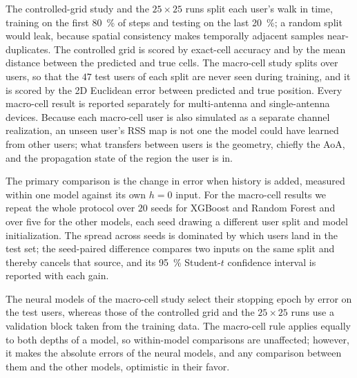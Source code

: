 The controlled-grid study and the $25\times25$ runs split each user's walk in time, training on the first \SI{80}{\percent} of steps and testing on the last \SI{20}{\percent}; a random split would leak, because spatial consistency makes temporally adjacent samples near-duplicates. The controlled grid is scored by exact-cell accuracy and by the mean distance between the predicted and true cells. The macro-cell study splits over users, so that the $47$ test users of each split are never seen during training, and it is scored by the 2D Euclidean error between predicted and true position. Every macro-cell result is reported separately for multi-antenna and single-antenna devices. Because each macro-cell user is also simulated as a separate channel realization, an unseen user's RSS map is not one the model could have learned from other users; what transfers between users is the geometry, chiefly the AoA, and the propagation state of the region the user is in.

The primary comparison is the change in error when history is added, measured within one model against its own $h=0$ input. For the macro-cell results we repeat the whole protocol over $20$ seeds for XGBoost and Random Forest and over five for the other models, each seed drawing a different user split and model initialization. The spread across seeds is dominated by which users land in the test set; the seed-paired difference compares two inputs on the same split and thereby cancels that source, and its \SI{95}{\percent} Student-$t$ confidence interval is reported with each gain.

The neural models of the macro-cell study select their stopping epoch by error on the test users, whereas those of the controlled grid and the $25\times25$ runs use a validation block taken from the training data. The macro-cell rule applies equally to both depths of a model, so within-model comparisons are unaffected; however, it makes the absolute errors of the neural models, and any comparison between them and the other models, optimistic in their favor.
